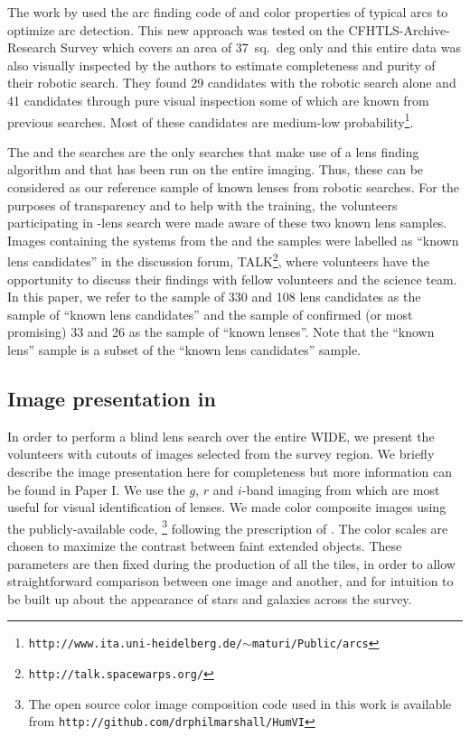 \documentclass[useAMS,usenatbib,a4paper]{mn2e}
\begin{document}
The work by \citet{Maturi2014} used the arc finding code of
\citet{Seidel2007} and color properties of typical arcs to optimize arc
detection. This new approach was tested on the CFHTLS-Archive-Research
Survey \citep[CARS,][]{Erben2009} which covers an area of 37~sq.~deg
only and this entire data was also visually inspected by the authors to
estimate completeness and purity of their robotic search. They found 29
candidates with the robotic search alone and 41 candidates through pure
visual inspection some of which are known from previous searches. Most
of these candidates are medium-low
probability\footnote{\texttt{http://www.ita.uni-heidelberg.de/$\sim$maturi/Public/arcs}}.

The \rf and the \af searches are the only searches that make use of a
lens finding algorithm and that has been run on the entire \cfhtls
imaging.  Thus, these can be considered as our reference sample of known
lenses from robotic searches. For the purposes of transparency and to
help with the training, the volunteers participating in \sw-\cfhtls lens
search were made aware of these two known lens samples. Images
containing the systems from the \rf and the \af samples were labelled as
``known lens candidates'' in the \sw discussion forum,
TALK\footnote{\texttt{http://talk.spacewarps.org/}}, where volunteers have the
opportunity to discuss their findings with fellow volunteers and the
science team. In this paper, we refer to the sample of 330 \rf and 108
\af lens candidates as the sample of ``known lens candidates'' and the
sample of confirmed (or most promising) 33 \rf and 26 \af as the sample
of ``known lenses''. Note that the ``known lens'' sample is a subset of
the ``known lens candidates'' sample.


\subsection{Image presentation in \sw}
\label{sec:data:impres}
In order to perform a blind lens search over the entire \cfhtls
WIDE, we present the volunteers with cutouts of images selected
from the survey region. We briefly describe the image presentation here
for completeness but more information can be found in Paper I. We use
the $g$, $r$ and $i$-band imaging from \cfhtls which are most useful for
visual identification of lenses.  We made color composite images using
the publicly-available code, \humvi\footnote{The open source  color image
composition code used in this work is available from
\texttt{http://github.com/drphilmarshall/HumVI}} following the
prescription of \citet{Lupton2004}. The color scales are chosen to
maximize the contrast between faint extended objects. These parameters
are then fixed during the production of all the tiles, in order to allow
straightforward comparison between one image and another, and for
intuition to be built up about the appearance of stars and galaxies
across the survey.
\end{document}
